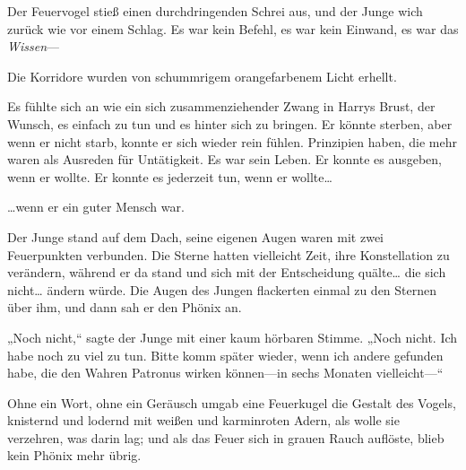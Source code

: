 Der Feuervogel stieß einen durchdringenden Schrei aus, und der Junge wich zurück wie vor einem Schlag. Es war kein Befehl, es war kein Einwand, es war das \emph{Wissen}—

Die Korridore wurden von schummrigem orangefarbenem Licht erhellt.

Es fühlte sich an wie ein sich zusammenziehender Zwang in Harrys Brust, der Wunsch, es einfach zu tun und es hinter sich zu bringen. Er könnte sterben, aber wenn er nicht starb, konnte er sich wieder rein fühlen. Prinzipien haben, die mehr waren als Ausreden für Untätigkeit. Es war sein Leben. Er konnte es ausgeben, wenn er wollte. Er konnte es jederzeit tun, wenn er wollte…

…wenn er ein guter Mensch war.

\later

Der Junge stand auf dem Dach, seine eigenen Augen waren mit zwei Feuerpunkten verbunden. Die Sterne hatten vielleicht Zeit, ihre Konstellation zu verändern, während er da stand und sich mit der Entscheidung quälte… die sich nicht… ändern würde.
Die Augen des Jungen flackerten einmal zu den Sternen über ihm, und dann sah er den Phönix an.

„Noch nicht,“ sagte der Junge mit einer kaum hörbaren Stimme. „Noch nicht. Ich habe noch zu viel zu tun. Bitte komm später wieder, wenn ich andere gefunden habe, die den Wahren Patronus wirken können—in sechs Monaten vielleicht—“

Ohne ein Wort, ohne ein Geräusch umgab eine Feuerkugel die Gestalt des Vogels, knisternd und lodernd mit weißen und karminroten Adern, als wolle sie verzehren, was darin lag; und als das Feuer sich in grauen Rauch auflöste, blieb kein Phönix mehr übrig.

